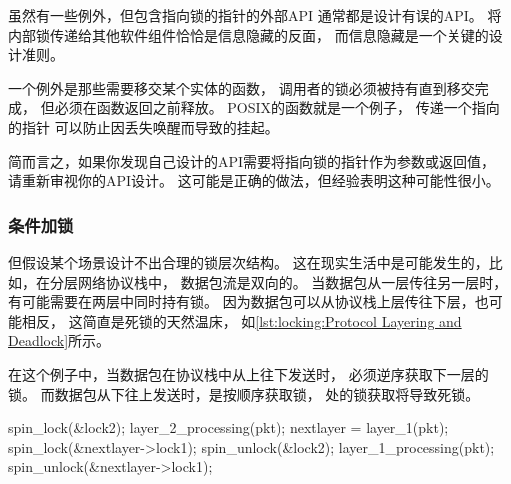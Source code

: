 虽然有一些例外，但包含指向锁的指针的外部API
通常都是设计有误的API。
将内部锁传递给其他软件组件恰恰是信息隐藏的反面，
而信息隐藏是一个关键的设计准则。

\QuickQuizEnd

一个例外是那些需要移交某个实体的函数，
调用者的锁必须被持有直到移交完成，
但必须在函数返回之前释放。
POSIX的函数就是一个例子，
传递一个指向的指针
可以防止因丢失唤醒而导致的挂起。

\QuickQuizEnd

简而言之，如果你发现自己设计的API需要将指向锁的指针作为参数或返回值，
请重新审视你的API设计。
这可能是正确的做法，但经验表明这种可能性很小。

\subsubsection{条件加锁}
\label{sec:locking:Conditional Locking}

但假设某个场景设计不出合理的锁层次结构。
这在现实生活中是可能发生的，比如，在分层网络协议栈中，
数据包流是双向的。
当数据包从一层传往另一层时，有可能需要在两层中同时持有锁。
因为数据包可以从协议栈上层传往下层，也可能相反，
这简直是死锁的天然温床，
如\cref{lst:locking:Protocol Layering and Deadlock}所示。
\begin{fcvref}
在这个例子中，当数据包在协议栈中从上往下发送时，
必须逆序获取下一层的锁。
而数据包从下往上发送时，是按顺序获取锁，
处的锁获取将导致死锁。
\end{fcvref}

\begin{listing}
\begin{fcvlabel}
\begin{VerbatimL}[commandchars=\\\{\}]
spin_lock(&lock2);
layer_2_processing(pkt);
nextlayer = layer_1(pkt);
spin_lock(&nextlayer->lock1);	
spin_unlock(&lock2);
layer_1_processing(pkt);
spin_unlock(&nextlayer->lock1);
\end{VerbatimL}
\end{fcvlabel}
\caption{协议分层与死锁}
\label{lst:locking:Protocol Layering and Deadlock}
\end{listing}

